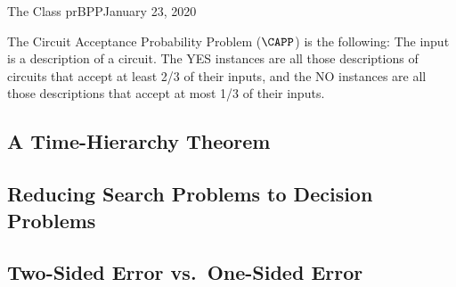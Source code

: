\begin{lecture}{1}{The Class prBPP}{January 23, 2020}
\begin{definition}
  The Circuit Acceptance Probability Problem ($\CAPP$) is the following: The input
  is a description of a circuit. The YES instances are all those descriptions
  of circuits that accept at least 2/3 of their inputs, and the NO instances
  are all those descriptions that accept at most 1/3 of their inputs.
\end{definition}

\subsection{A Time-Hierarchy Theorem}

\subsection{Reducing Search Problems to Decision Problems}

\subsection{Two-Sided Error vs.\ One-Sided Error}

\end{lecture}
